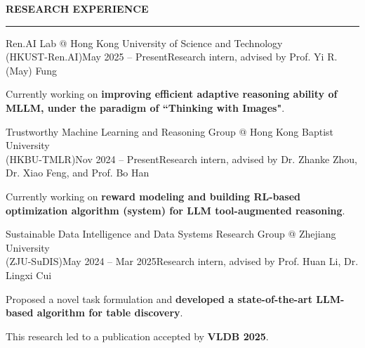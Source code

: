 \documentclass{resume} %
\newcommand{\entitycolor}[1]{{\color{EntityColor}#1}}
\renewenvironment{rSection}[1]{
  \sectionskip
  \textcolor{ZJUBlue}{\bfseries\MakeUppercase{#1}} %
  \sectionlineskip
  \hrule
  \begin{list}{}{
    \setlength{\leftmargin}{1.5em}
  }
  \item[]
}{
  \end{list}
}
\begin{document}
\begin{rSection}{Research Experience}

  \begin{rSubsection}{\entitycolor{Ren.AI Lab @ Hong Kong University of Science and Technology \\ (HKUST-Ren.AI)}}{May 2025 -- Present}{Research intern, advised by \entitycolor{Prof. Yi R. (May) Fung}}{}
    \item Currently working on {\bf improving efficient adaptive reasoning ability of MLLM, under the paradigm of ``Thinking with Images"}.
  \end{rSubsection}
  
  \begin{rSubsection}{\entitycolor{Trustworthy Machine Learning and Reasoning Group @ Hong Kong Baptist University \\ (HKBU-TMLR)}}{Nov 2024 -- Present}{Research intern, advised by \entitycolor{Dr. Zhanke Zhou, Dr. Xiao Feng, and Prof. Bo Han}}{}
    \item Currently working on { \bf reward modeling and building RL-based optimization algorithm (system) for LLM tool-augmented reasoning}.
  \end{rSubsection}

  \begin{rSubsection}{\entitycolor{Sustainable Data Intelligence and Data Systems Research Group @ Zhejiang University \\ (ZJU-SuDIS)}}{May 2024 -- Mar 2025}{Research intern, advised by \entitycolor{Prof. Huan Li, Dr. Lingxi Cui}}{}
    \item Proposed a novel task formulation and { \bf developed a state-of-the-art LLM-based algorithm for table discovery}.
    \item This research led to a publication accepted by {\bf VLDB 2025}.
  \end{rSubsection}
  
\end{rSection}
\end{document}
